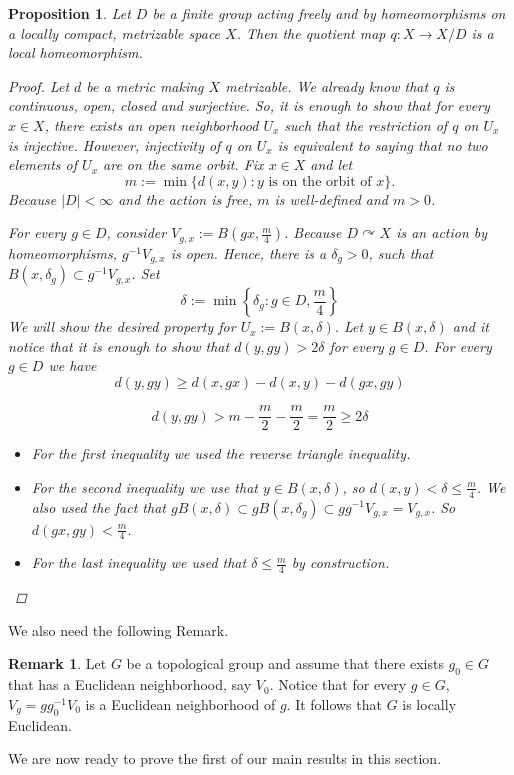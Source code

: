\documentclass[11pt, twoside]{amsart}
\renewcommand{\l}{\left}
\renewcommand{\r}{\right}
\newtheorem{prop}[thm]{Proposition}
\theoremstyle{definition}
\newtheorem{rmk}[thm]{Remark}
\begin{document}
\begin{prop}\label{actions with finite groups give local isom}
Let $D$ be a finite group acting freely and by homeomorphisms on a locally compact, metrizable space $X$. Then the quotient map $q:X\rightarrow X/D$ is a local homeomorphism.
\begin{proof}
    Let $d$ be a metric making $X$ metrizable. We already know that $q$ is continuous, open, closed and surjective. So, it is enough to show that for every $x\in X$, there exists an open neighborhood $U_x$ such that the restriction of $q$ on $U_x$ is injective. However, injectivity of $q$ on $U_x$ is equivalent to saying that no two elements of $U_x$ are on the same orbit. Fix $x\in X$ and let 
    \[m:=\min\{d(x,y)\colon y \text{ is on the orbit of }x \}.\]
    Because $|D|<\infty$ and the action is free, $m$ is well-defined and $m>0$. \par
    For every $g\in D$, consider $V_{g,x}:=B(gx, \frac{m}{4})$. Because $D\curvearrowright X$ is an action by homeomorphisms, $g^{-1}V_{g,x}$ is open. Hence, there is a $\delta_g>0$, such that $B(x,\delta_g)\subset g^{-1}V_{g,x}$. Set $$\delta:=\min\l\{\delta_g: g\in D, \frac{m}{4} \r\}$$
    We will show the desired property for $U_x:=B(x,\delta)$. Let $y\in B(x,\delta)$ and it notice that it is enough to show that $d(y,gy)>2\delta$ for every $g\in D$. For every $g\in D$ we have
    $$d(y,gy)\geq d(x,gx)-d(x,y)-d(gx,gy)$$
    
    $$d(y,gy)>m-\frac{m}{2}-\frac{m}{2}=\frac{m}{2}\geq 2\delta$$
    \begin{itemize}
        \item For the first inequality we used the reverse triangle inequality.
        \item For the second inequality we use that $y\in B(x,\delta)$, so $d(x,y)<\delta\leq \frac{m}{4}$. We also used the fact that $gB(x,\delta)\subset gB(x,\delta_g)\subset gg^{-1}V_{g,x}=V_{g,x}$. So $d(gx,gy)<\frac{m}{4}$.
        \item For the last inequality we used that $\delta\leq \frac{m}{4}$ by construction.
    \end{itemize}
    
\end{proof}
\end{prop}
We also need the following Remark.
\begin{rmk}\label{locally_euclidean_homogeneous}
    Let $G$ be a topological group and assume that there exists $g_0\in G$ that has a Euclidean neighborhood, say $V_0$. Notice that for every $g\in G$, $V_g=gg_0^{-1}V_0$ is a Euclidean neighborhood of $g$. It follows that $G$ is locally Euclidean.
\end{rmk}
 We are now ready to prove the first of our main results in this section.
 
\end{document}
